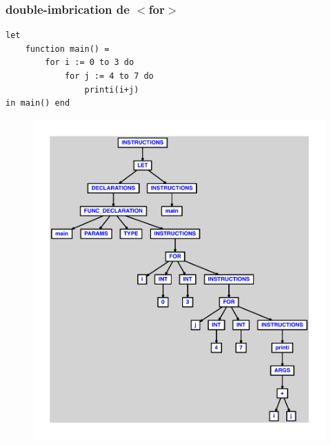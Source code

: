 \documentclass{article}
\begin{document}
\subsubsection{double-imbrication de $ < $for$ > $}
\begin{lstlisting}
let
	function main() =
		for i := 0 to 3 do
			for j := 4 to 7 do
				printi(i+j)
in main() end
\end{lstlisting}
\newpage
\begin{figure}[H]
\centering
\includegraphics[max width=\textwidth]{ast/ast_209.pdf}
\end{figure}
\newpage
\end{document}
